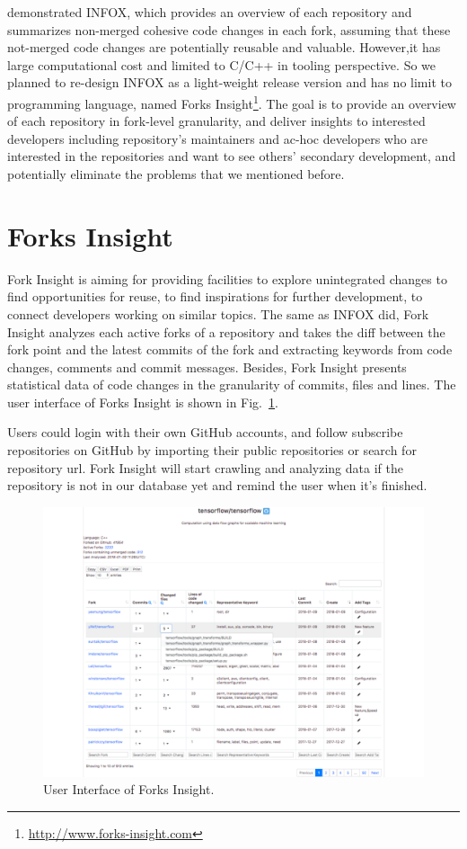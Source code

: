 \citet{ZSLXWK:ICSE18} demonstrated INFOX, which provides an overview of each repository and summarizes non-merged cohesive code changes in each fork, assuming that these not-merged code changes are potentially reusable and valuable. However,it has large computational cost and limited to C/C++ in tooling perspective. So we planned to re-design INFOX as a light-weight release version and has no limit to programming language, named Forks Insight\footnote{\url{http://www.forks-insight.com}}. The goal is to provide an overview of each repository in fork-level granularity, and deliver insights to interested developers including repository's maintainers and ac-hoc developers who are interested in the repositories and want to see others' secondary development, and potentially eliminate the problems that we mentioned before.


\section{Forks Insight}

Fork Insight is aiming for providing facilities to explore unintegrated changes to find opportunities for reuse, to find inspirations for further development, to connect developers working on similar topics.
%
The same as INFOX did, Fork Insight analyzes each active forks of a repository and takes the diff between the fork point and the latest commits of the fork and extracting keywords from code changes, comments and commit messages.
%
Besides, Fork Insight presents statistical data of code changes in the granularity of commits, files and lines. The user interface of Forks Insight is shown in Fig.~\ref{GUI}. 


Users could login with their own GitHub accounts, and follow subscribe repositories on GitHub by importing their public repositories or search for repository url. Fork Insight will start crawling and analyzing data if the repository is not in our database yet and remind the user when it's finished.

\begin{figure}[t]
\includegraphics[scale=0.3]{tensorflow_snapshot3.pdf}
\caption{User Interface of Forks Insight.}
	\vspace{-15pt}
	 \label{GUI}
\end{figure}

